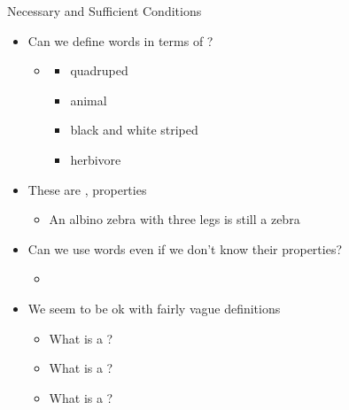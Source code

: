 \begin{frame}{Necessary and Sufficient Conditions}

\begin{itemize}
\item Can we define words in terms of ?
  \begin{itemize}
  \item {}
    \begin{itemize}
    \item quadruped
    \item animal 
    \item black and white striped
    \item herbivore
    \end{itemize}
  \end{itemize}
\item These are ,  properties
  
  \begin{itemize}
  \item An albino zebra with three legs is still a zebra
  \end{itemize}
\item Can we use words even if we don't know their properties?
  \begin{itemize}
  \item {}
  \end{itemize}
\item We seem to be ok with fairly vague definitions
  \begin{taskb}
  \begin{itemize}
  \item What is a ? 
  \item What is a ?
  \item What is a ?
  \end{itemize}
\end{taskb}
\end{itemize}

\end{frame}


